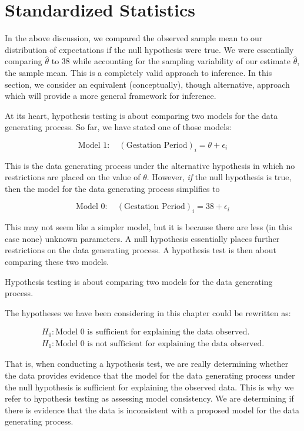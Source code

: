 \documentclass[]{book}
\theoremstyle{plain}
\theoremstyle{mydefn}
\theoremstyle{myexmpl}
\theoremstyle{remark}
\let\BeginKnitrBlock\begin \let\EndKnitrBlock\end
\let\BeginKnitrBlock\begin \let\EndKnitrBlock\end
\begin{document}
\section{Standardized Statistics}\label{standardized-statistics}

In the above discussion, we compared the observed sample mean to our
distribution of expectations if the null hypothesis were true. We were
essentially comparing \(\widehat{\theta}\) to 38 while accounting for
the sampling variability of our estimate \(\widehat{\theta}\), the
sample mean. This is a completely valid approach to inference. In this
section, we consider an equivalent (conceptually), though alternative,
approach which will provide a more general framework for inference.

At its heart, hypothesis testing is about comparing two models for the
data generating process. So far, we have stated one of those models:

\[\text{Model 1}: \quad (\text{Gestation Period})_i = \theta + \epsilon_i\]

This is the data generating process under the alternative hypothesis in
which no restrictions are placed on the value of \(\theta\). However,
\emph{if} the null hypothesis is true, then the model for the data
generating process simplifies to

\[\text{Model 0}: \quad (\text{Gestation Period})_i = 38 + \epsilon_i\]

This may not seem like a simpler model, but it is because there are less
(in this case none) unknown parameters. A null hypothesis essentially
places further restrictions on the data generating process. A hypothesis
test is then about comparing these two models.

\BeginKnitrBlock{rmdkeyidea}
Hypothesis testing is about comparing two models for the data generating
process.
\EndKnitrBlock{rmdkeyidea}

The hypotheses we have been considering in this chapter could be
rewritten as:

\[
\begin{aligned}
  H_0: \text{Model 0 is sufficient for explaining the data observed.} \\
  H_1: \text{Model 0 is not sufficient for explaining the data observed.}
\end{aligned}
\]

That is, when conducting a hypothesis test, we are really determining
whether the data provides evidence that the model for the data
generating process under the null hypothesis is sufficient for
explaining the observed data. This is why we refer to hypothesis testing
as assessing model consistency. We are determining if there is evidence
that the data is inconsistent with a proposed model for the data
generating process.
\end{document}

